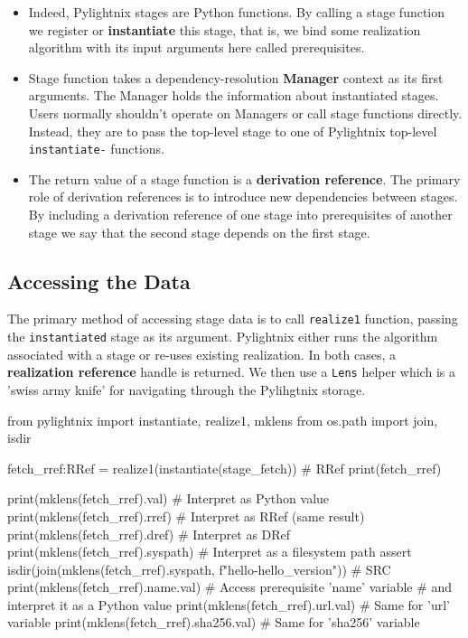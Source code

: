 \begin{itemize}

  \item Indeed, Pylightnix stages are Python functions. By calling a stage
    function we register or \textbf{instantiate} this stage, that is, we bind
    some realization algorithm with its input arguments here called
    prerequisites.

  \item Stage function takes a dependency-resolution \textbf{Manager} context as
    its first arguments. The Manager holds the information about instantiated
    stages. Users normally shouldn't operate on Managers or call stage functions
    directly. Instead, they are to pass the top-level stage to one of Pylightnix
    top-level \texttt{instantiate-} functions.

  \item The return value of a stage function is a \textbf{derivation reference}.
    The primary role of derivation references is to introduce new dependencies
    between stages. By including a derivation reference of one stage into
    prerequisites of another stage we say that the second stage depends on the
    first stage.


\end{itemize}

\pagebreak
\subsection{Accessing the Data}

The primary method of accessing stage data is to call \texttt{realize1} function,
passing the \texttt{instantiated} stage as its argument. Pylightnix either runs
the algorithm associated with a stage or re-uses existing realization. In both
cases, a \textbf{realization reference} handle is returned. We then use a
\texttt{Lens} helper which is a 'swiss army knife' for navigating through the
Pylihgtnix storage.

\begin{pythontexcode}
from pylightnix import instantiate, realize1, mklens
from os.path import join, isdir

fetch_rref:RRef = realize1(instantiate(stage_fetch))  # RRef \label{RREF}
print(fetch_rref)

print(mklens(fetch_rref).val)      # Interpret as Python value
print(mklens(fetch_rref).rref)     # Interpret as RRef (same result)
print(mklens(fetch_rref).dref)     # Interpret as DRef
print(mklens(fetch_rref).syspath)  # Interpret as a filesystem path
assert isdir(join(mklens(fetch_rref).syspath,
             f"hello-{hello_version}"))  # SRC \label{SRC}
print(mklens(fetch_rref).name.val) # Access prerequisite 'name' variable
                                   # and interpret it as a Python value
print(mklens(fetch_rref).url.val)  # Same for 'url' variable
print(mklens(fetch_rref).sha256.val)  # Same for 'sha256' variable
\end{pythontexcode}

